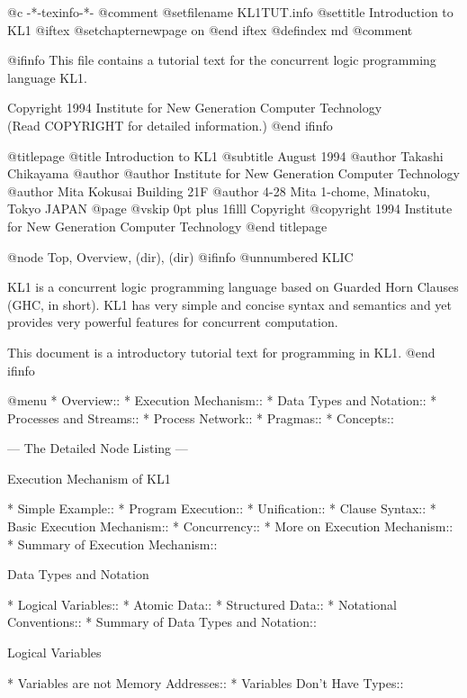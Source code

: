   @c -*-texinfo-*-
@comment %
@setfilename KL1TUT.info
@settitle Introduction to KL1
@iftex
@setchapternewpage on
@end iftex
@defindex md
@comment %

@ifinfo
This file contains a tutorial text for the concurrent logic
programming language KL1.

Copyright 1994 Institute for New Generation Computer Technology\\
(Read COPYRIGHT for detailed information.)
@end ifinfo

@titlepage
@title Introduction to KL1
@subtitle August 1994
@author Takashi Chikayama
@author
@author Institute for New Generation Computer Technology
@author Mita Kokusai Building 21F
@author 4-28 Mita 1-chome, Minatoku, Tokyo JAPAN
@page
@vskip 0pt plus 1filll
Copyright @copyright{} 1994 Institute for New Generation Computer Technology
@end titlepage

@node Top, Overview, (dir), (dir)
@ifinfo
@unnumbered KLIC

KL1 is a concurrent logic programming language based on Guarded Horn
Clauses (GHC, in short).  KL1 has very simple and concise syntax and
semantics and yet provides very powerful features for concurrent
computation.

This document is a introductory tutorial text for programming in KL1.
@end ifinfo

@menu
* Overview::                    
* Execution Mechanism::         
* Data Types and Notation::     
* Processes and Streams::       
* Process Network::             
* Pragmas::                     
* Concepts::                    

 --- The Detailed Node Listing ---

Execution Mechanism of KL1

* Simple Example::              
* Program Execution::           
* Unification::                 
* Clause Syntax::               
* Basic Execution Mechanism::   
* Concurrency::                 
* More on Execution Mechanism::  
* Summary of Execution Mechanism::  

Data Types and Notation

* Logical Variables::           
* Atomic Data::                 
* Structured Data::             
* Notational Conventions::      
* Summary of Data Types and Notation::  

Logical Variables

* Variables are not Memory Addresses::  
* Variables Don't Have Types::  


